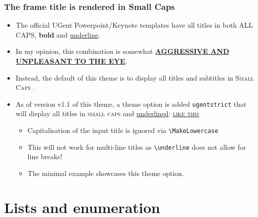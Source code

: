 \documentclass[aspectratio=169]{beamer}
\begin{document}
\begin{frame}[fragile]
    \frametitle{The frame title is rendered in Small Caps}
    \begin{itemize}
        \itemsep.25cm
        \item The official UGent Powerpoint/Keynote templates have all titles in both ALL CAPS, \textbf{bold} and \underline{underline}.\\[.5cm]
        \item In my opinion, this combination is somewhat \underline{\textbf{AGGRESSIVE AND UNPLEASANT TO THE EYE}}.
        \item Instead, the default of this theme is to display all titles and subtitles in \textsc{Small Caps} .
        \item As of version v1.1 of this theme, a theme option is added \texttt{ugentstrict} that will display all titles in \textsc{small caps} and \underline{underlined}: \underline{\MakeLowercase{\textsc{like this}}}
            \begin{itemize}
                \itemsep.25cm
                \item Capitalisation of the input title is ignored via \verb|\MakeLowercase|
                \item This will not work for multi-line titles as \verb|\underline| does not allow for line breaks!
                \item The minimal example showcases this theme option.
            \end{itemize}
            
    \end{itemize}
    
\end{frame}


\section{Lists and enumeration}
\end{document}
